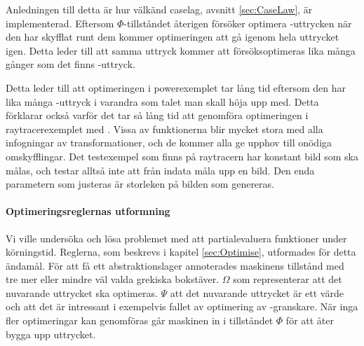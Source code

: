 \documentclass[Rapport]{subfiles}
\begin{document}
Anledningen till detta är hur välkänd caselag, avsnitt \ref{sec:CaseLaw}, är 
implementerad. Eftersom $\Phi$-tillståndet återigen försöker optimera -uttrycken
när den har skyfflat runt dem kommer optimeringen att gå igenom hela uttrycket igen.
Detta leder till att samma uttryck kommer att försöksoptimeras lika många gånger
som det finns -uttryck.  

Detta leder till att optimeringen i powerexemplet tar lång tid eftersom den har lika
många -uttryck i varandra som talet man skall höja upp med.
Detta förklarar också varför det tar så lång tid att genomföra optimeringen
i raytracerexemplet med . Vissa av funktionerna blir mycket stora med alla infogningar
av transformationer, och de kommer alla ge upphov till onödiga omskyfflingar.
Det testexempel som finns på raytracern har konstant bild som ska målas, och
testar alltså inte att från indata måla upp en bild. Den enda parametern som
justeras är storleken på bilden som genereras.

\begin{comment}
\NOTE{
Ett buggigt försök att beskriva varför vi har utformat reglerna.

kan tas bort om det tex är uselt

baserat på den här diskussionen mellan Daniel och Simon:

        i evalueringsform. vi optimerar inte saker ännu inte används
        tracing jit säger Daniel
        hur gör man det jit säger Simon
        Daniel pratar om execution-paths

        det finns troligtvis bättre modeller men vi har inte gjort dem

        vi har inte heller kollat så djupt i litteraturen
            och det var kul att komma på själva
            och det var inte så bra gjort av oss
            men vi får göra så för det är ett kandiatarbete
}
\end{comment}

\paragraph{Optimeringsreglernas utformning}
Vi ville undersöka och lösa problemet med att partialevaluera funktioner
under körningstid. Reglerna, som beskrevs i kapitel \ref{sec:Optimise}, 
utformades för detta ändamål. För att få ett abstraktionslager annoterades
maskinens tillstånd med tre mer eller mindre väl valda grekiska bokstäver.
$\Omega$ som representerar att det nuvarande uttrycket ska optimeras.
$\Psi$ att det nuvarande uttrycket är ett värde och att det är intressant
i exempelvis fallet av optimering av -granskare.
När inga fler optimeringar kan genomföras går maskinen in i tillståndet $\Phi$ 
för att åter bygga upp uttrycket.
\end{document}

